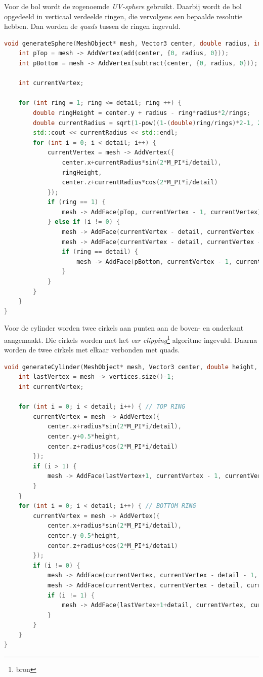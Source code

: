 \documentclass[12pt, a4paper]{article}
\begin{document}
Voor de bol wordt de zogenoemde \textit{UV-sphere} gebruikt. %
Daarbij wordt de bol opgedeeld in verticaal verdeelde ringen, die vervolgens een bepaalde resolutie hebben. Dan worden de \textit{quads} tussen de ringen ingevuld.

\begin{lstlisting}[language=c++]
void generateSphere(MeshObject* mesh, Vector3 center, double radius, int rings, int detail) {
	int pTop = mesh -> AddVertex(add(center, {0, radius, 0}));
	int pBottom = mesh -> AddVertex(subtract(center, {0, radius, 0}));
	
	int currentVertex;
	
	for (int ring = 1; ring <= detail; ring ++) {
		double ringHeight = center.y + radius - ring*radius*2/rings;
		double currentRadius = sqrt(1-pow((1-(double)ring/rings)*2-1, 2))*radius;
		std::cout << currentRadius << std::endl;
		for (int i = 0; i < detail; i++) {
			currentVertex = mesh -> AddVertex({
				center.x+currentRadius*sin(2*M_PI*i/detail),
				ringHeight,
				center.z+currentRadius*cos(2*M_PI*i/detail)
			});
			if (ring == 1) {
				mesh -> AddFace(pTop, currentVertex - 1, currentVertex);
			} else if (i != 0) {
				mesh -> AddFace(currentVertex - detail, currentVertex - 1, currentVertex);
				mesh -> AddFace(currentVertex - detail, currentVertex - detail - 1, currentVertex - 1);
				if (ring == detail) {
					mesh -> AddFace(pBottom, currentVertex - 1, currentVertex);
				}
			}
		}
	}
}
\end{lstlisting}

Voor de cylinder worden twee cirkels aan punten aan de boven- en onderkant aangemaakt. Die cirkels worden met het \textit{ear clipping}\footnote{bron} algoritme ingevuld. Daarna worden de twee cirkels met elkaar verbonden met quads.

\begin{lstlisting}[language=c++]
void generateCylinder(MeshObject* mesh, Vector3 center, double height, double radius, int detail) {
	int lastVertex = mesh -> vertices.size()-1;
	int currentVertex;
	
	for (int i = 0; i < detail; i++) { // TOP RING
		currentVertex = mesh -> AddVertex({
			center.x+radius*sin(2*M_PI*i/detail), 
			center.y+0.5*height, 
			center.z+radius*cos(2*M_PI*i/detail)
		});
		if (i > 1) {
			mesh -> AddFace(lastVertex+1, currentVertex - 1, currentVertex);
		}
	} 
	for (int i = 0; i < detail; i++) { // BOTTOM RING
		currentVertex = mesh -> AddVertex({
			center.x+radius*sin(2*M_PI*i/detail), 
			center.y-0.5*height, 
			center.z+radius*cos(2*M_PI*i/detail)
		});
		if (i != 0) {
			mesh -> AddFace(currentVertex, currentVertex - detail - 1, currentVertex - 1);
			mesh -> AddFace(currentVertex, currentVertex - detail, currentVertex - detail - 1);
			if (i != 1) {
				mesh -> AddFace(lastVertex+1+detail, currentVertex, currentVertex - 1);
			}
		}
	}
}
\end{lstlisting}
\end{document}
